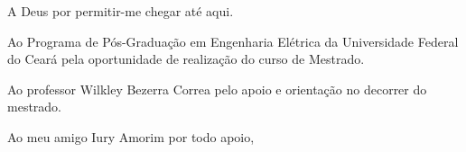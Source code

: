 A Deus por permitir-me chegar até aqui. 

Ao Programa de Pós-Graduação em Engenharia Elétrica da Universidade Federal do Ceará pela oportunidade de realização do curso de Mestrado.

Ao professor Wilkley Bezerra Correa pelo apoio e orientação no decorrer do mestrado.

Ao meu amigo Iury Amorim por todo apoio,
